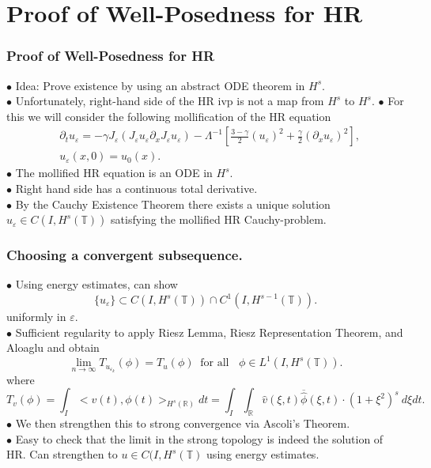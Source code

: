 \documentclass{beamer}
\newcommand{\rr}{\mathbb{R}}
\newcommand{\p}{\partial}
\newcommand{\ci}{\mathbb{T}}
\newcommand{\ee}{\varepsilon}
\begin{document}
\section{Proof of Well-Posedness for HR}
\begin{frame}
	\frametitle{Proof of Well-Posedness for HR}

%
%
%
%
%
%
%
%
%
%
$\bullet$ Idea: 
Prove existence by using an abstract ODE theorem in $H^s$.
\\
\pause $\bullet$ Unfortunately, 
right-hand side of the HR ivp is not a map from $H^s$ to $H^s$.
\pause $\bullet$ For this we will consider the following mollification of the HR equation
%
%
\begin{align*}
& \p_t  u_\ee =
-\gamma J_\ee(J_\ee u_\ee \partial_x  J_\ee  u_\ee) - \Lambda^{-1} \left 
[\frac{3-\gamma}{2}(u_\ee)^2 + \frac{\gamma}{2}(\p_x u_\ee)^2 \right ],
\\
& u_\ee(x, 0) = u_0 (x).
\label{hr-moli-data}
\end{align*}
%
% 
%
%
%
%
%
%
$\bullet$ The mollified HR equation 
is an ODE in $H^s$.
\\
$\bullet$ Right hand side has a continuous total derivative.
\\
\pause $\bullet$ By the Cauchy Existence Theorem there exists a
unique solution $u_\ee \in C(I, H^s(\ci))$ satisfying the mollified HR 
Cauchy-problem.
\end{frame}
%
%
%
%
%
%
%
\begin{frame}
	\frametitle{Choosing  a convergent subsequence.}
%
$\bullet$ Using energy estimates, can show
%
%
%
\begin{equation*}
\label{Lip-1-fam}
\{u_\ee\}\subset C(I, H^s(\ci))\cap C^1(I,
H^{s-1}(\ci)).
\end{equation*}
%
uniformly in $\ee$. 
%
%
\\
\pause
$\bullet$ Sufficient regularity to apply Riesz Lemma, Riesz Representation Theorem, and Aloaglu and obtain 
%
%
%
%
%
%
%
%
\begin{equation*}
\label{weak-conv}
\lim_{n\to \infty} T_{u_{\ee_k}}(\phi)  =  T_u (\phi) \; \;		\text{for 
all } \;\;  \phi \in L^1(I, H^{s}(\ci)).
\end{equation*}
%
where 
\begin{equation*}
T_v(\phi) = \int_I <v (t), \phi (t)>_{H^s(\rr)} dt  = \int_I
\int_{\rr}
\widehat{v}(\xi, t) \overline{\widehat{\phi}}(\xi, t) \cdot (1
+ \xi^2)^s \ d \xi dt.
\end{equation*}
%
%
\pause
$\bullet$ We then strengthen this to strong convergence via Ascoli's Theorem.
\\
\pause
$\bullet$ Easy to check that the limit in the strong topology is indeed the solution of HR\@. Can strengthen to $u \in C(I, H^{s}(\ci)$ using energy estimates. 
\end{frame}
\end{document}
